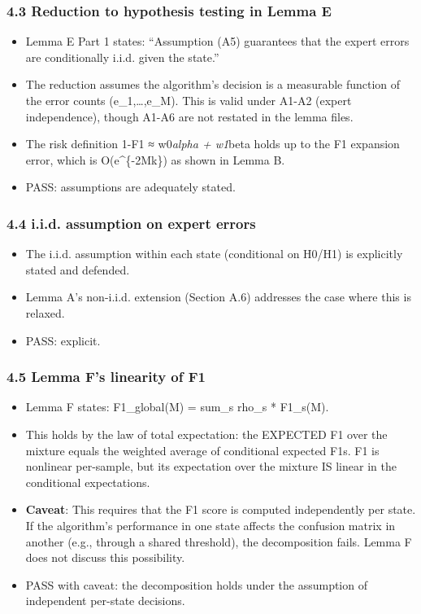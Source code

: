 \documentclass[
  12pt,
]{article}
\providecommand{\tightlist}{%
  \setlength{\itemsep}{0pt}\setlength{\parskip}{0pt}}
\begin{document}
\subsubsection{4.3 Reduction to hypothesis testing in Lemma
E}\label{reduction-to-hypothesis-testing-in-lemma-e}

\begin{itemize}
\tightlist
\item
  Lemma E Part 1 states: ``Assumption (A5) guarantees that the expert
  errors are conditionally i.i.d. given the state.''
\item
  The reduction assumes the algorithm's decision is a measurable
  function of the error counts (e\_1,\ldots,e\_M). This is valid under
  A1-A2 (expert independence), though A1-A6 are not restated in the
  lemma files.
\item
  The risk definition 1-F1 ≈ w0\emph{alpha + w1}beta holds up to the F1
  expansion error, which is O(e\^{}\{-2Mk\}) as shown in Lemma B.
\item
  PASS: assumptions are adequately stated.
\end{itemize}

\subsubsection{4.4 i.i.d. assumption on expert
errors}\label{i.i.d.-assumption-on-expert-errors}

\begin{itemize}
\tightlist
\item
  The i.i.d. assumption within each state (conditional on H0/H1) is
  explicitly stated and defended.
\item
  Lemma A's non-i.i.d. extension (Section A.6) addresses the case where
  this is relaxed.
\item
  PASS: explicit.
\end{itemize}

\subsubsection{4.5 Lemma F's linearity of
F1}\label{lemma-fs-linearity-of-f1}

\begin{itemize}
\tightlist
\item
  Lemma F states: F1\_global(M) = sum\_s rho\_s * F1\_s(M).
\item
  This holds by the law of total expectation: the EXPECTED F1 over the
  mixture equals the weighted average of conditional expected F1s. F1 is
  nonlinear per-sample, but its expectation over the mixture IS linear
  in the conditional expectations.
\item
  \textbf{Caveat}: This requires that the F1 score is computed
  independently per state. If the algorithm's performance in one state
  affects the confusion matrix in another (e.g., through a shared
  threshold), the decomposition fails. Lemma F does not discuss this
  possibility.
\item
  PASS with caveat: the decomposition holds under the assumption of
  independent per-state decisions.
\end{itemize}
\end{document}
